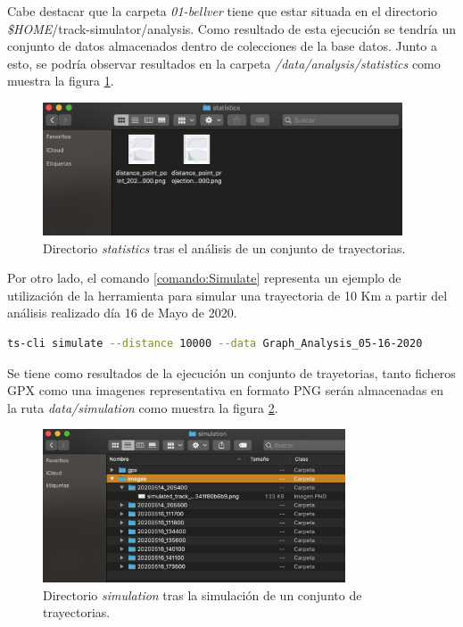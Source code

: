 Cabe destacar que la carpeta \textit{01-bellver} tiene que estar situada en el directorio \textit{\$HOME}/track-simulator/analysis. Como resultado de esta ejecución se tendría un conjunto de datos almacenados dentro de colecciones de la base datos. Junto a esto, se podría observar resultados en la carpeta \textit{/data/analysis/statistics} como muestra la figura \ref{figure:StatisticsFolder}.

\begin{figure}[!htb]
\begin{center}
\includegraphics[width=0.95\textwidth]{./Imagenes/statisticsFolderResults.png}
\caption{Directorio \textit{statistics} tras el análisis de un conjunto de trayectorias.}
\label{figure:StatisticsFolder}
\end{center}
\end{figure}


Por otro lado,  el comando \ref{comando:Simulate} representa un ejemplo de utilización de la herramienta para simular una trayectoria de 10 Km a partir del análisis realizado día 16 de Mayo de 2020.

\begin{lstlisting}[caption={Ejecución simulación}, language=bash, label={comando:Simulate}]  
	ts-cli simulate --distance 10000 --data Graph_Analysis_05-16-2020
\end{lstlisting}

Se tiene como resultados de la ejecución un conjunto de trayetorias, tanto ficheros \ac{GPX} como una imagenes representativa en formato \ac{PNG} serán almacenadas en la ruta \textit{data\slash simulation} como muestra la figura \ref{figure:SimulationFolder}.
\begin{figure}[!htb]
\begin{center}
\includegraphics[width=0.8\textwidth]{./Imagenes/SimulationFolderResults.png}
\caption{Directorio \textit{simulation} tras la simulación de un conjunto de trayectorias.}
\label{figure:SimulationFolder}
\end{center}
\end{figure}


